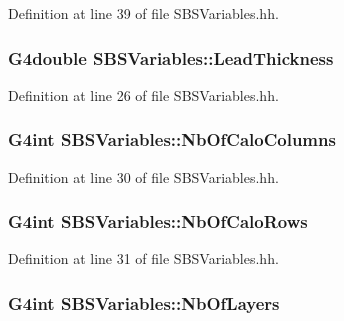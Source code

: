 Definition at line 39 of file S\-B\-S\-Variables.\-hh.

\hypertarget{class_s_b_s_variables_ac18998a9e16bed4d4737bd3fdbe3032e}{
\subsubsection[{Lead\-Thickness}]{\setlength{\rightskip}{0pt plus 5cm}G4double S\-B\-S\-Variables\-::\-Lead\-Thickness}}\label{class_s_b_s_variables_ac18998a9e16bed4d4737bd3fdbe3032e}


Definition at line 26 of file S\-B\-S\-Variables.\-hh.

\hypertarget{class_s_b_s_variables_adc90201ebd65e3b3366b1b6f4dff5ebf}{
\subsubsection[{Nb\-Of\-Calo\-Columns}]{\setlength{\rightskip}{0pt plus 5cm}G4int S\-B\-S\-Variables\-::\-Nb\-Of\-Calo\-Columns}}\label{class_s_b_s_variables_adc90201ebd65e3b3366b1b6f4dff5ebf}


Definition at line 30 of file S\-B\-S\-Variables.\-hh.

\hypertarget{class_s_b_s_variables_acf7deca6d17faac95752ce05c0c49d55}{
\subsubsection[{Nb\-Of\-Calo\-Rows}]{\setlength{\rightskip}{0pt plus 5cm}G4int S\-B\-S\-Variables\-::\-Nb\-Of\-Calo\-Rows}}\label{class_s_b_s_variables_acf7deca6d17faac95752ce05c0c49d55}


Definition at line 31 of file S\-B\-S\-Variables.\-hh.

\hypertarget{class_s_b_s_variables_adec94678029bfd057c6ba3daabe6f5a3}{
\subsubsection[{Nb\-Of\-Layers}]{\setlength{\rightskip}{0pt plus 5cm}G4int S\-B\-S\-Variables\-::\-Nb\-Of\-Layers}}\label{class_s_b_s_variables_adec94678029bfd057c6ba3daabe6f5a3}



